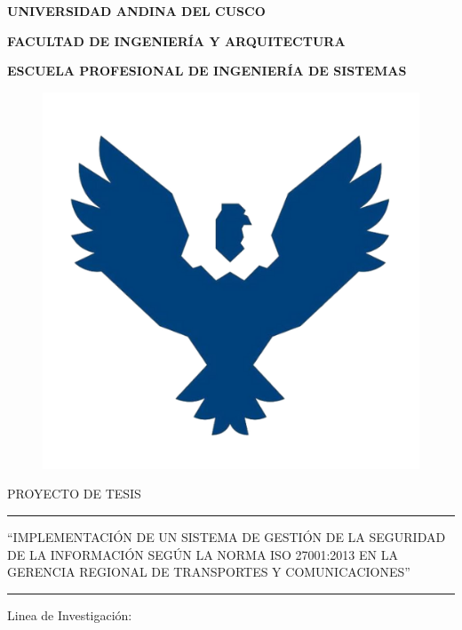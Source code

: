 \begin{titlepage}
	\begin{center}
		{\LARGE \textbf{UNIVERSIDAD ANDINA DEL CUSCO}}
		
		\vspace{0.5cm}
		{\large \textbf{FACULTAD DE INGENIERÍA Y ARQUITECTURA}}
		
		\vspace{0.5cm}		
		{\large \textbf{ESCUELA PROFESIONAL DE INGENIERÍA DE SISTEMAS}}
		\begin{figure}[h]
			\centering	
			\includegraphics[scale=0.40]{imagenes/logo.png}		
		\end{figure}
		
		{\large {PROYECTO DE TESIS}}
		
		\rule{163mm}{0.3mm}		
		
		
		\begin{spacing}{1}
			{\large ``IMPLEMENTACIÓN DE UN SISTEMA DE GESTIÓN DE LA SEGURIDAD DE LA INFORMACIÓN SEGÚN LA NORMA ISO 27001:2013 EN LA GERENCIA REGIONAL DE TRANSPORTES Y COMUNICACIONES''}
		\end{spacing} 
		
		
		\rule{163mm}{0.3mm}
		
		\vspace{0.5cm}
		
		{\large {Linea de Investigación: }}
		\vspace{0.5cm}
		

\end{center}
\end{titlepage}
